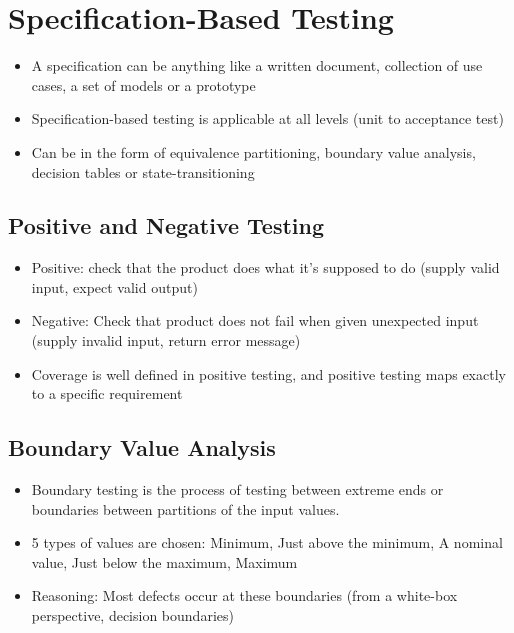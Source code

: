 \documentclass{article}
\begin{document}
\section{Specification-Based Testing}
\begin{itemize}
    \item A specification can be anything like a written document, collection of use cases, a set of models or a prototype
    
    \item Specification-based testing is applicable at all levels (unit to acceptance test)
    
    \item Can be in the form of equivalence partitioning, boundary value analysis, decision tables or state-transitioning
\end{itemize}

\subsection{Positive and Negative Testing}
\begin{itemize}
    \item Positive: check that the product does what it's supposed to do (supply valid input, expect valid output)
    
    \item Negative: Check that product does not fail when given unexpected input (supply invalid input, return error message)
    
    \item Coverage is well defined in positive testing, and positive testing maps exactly to a specific requirement
\end{itemize}

\subsection{Boundary Value Analysis}
\begin{itemize}
    \item Boundary testing is the process of testing between extreme ends or boundaries between partitions of the input values.
    
    \item 5 types of values are chosen: Minimum, Just above the minimum, A nominal value, Just below the maximum, Maximum
    
    \item Reasoning: Most defects occur at these boundaries (from a white-box perspective, decision boundaries)
\end{itemize}
\end{document}
